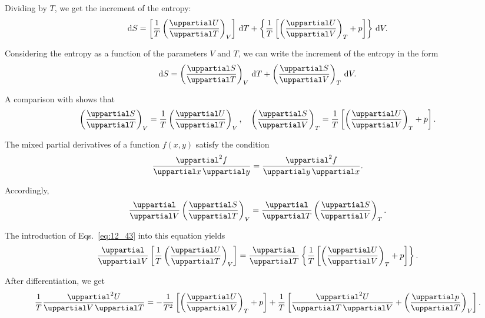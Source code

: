 Dividing  by $T$, we get the increment of the entropy:
\begin{equation}\label{eq:12_42}
	\deriv{S} = \bracket{\frac{1}{T} \parenthesis{\diffpartial{U}{T}}_V} \, \deriv{T} + \bracet{\frac{1}{T} \bracket{\parenthesis{\diffpartial{U}{V}}_T + p}}\,\deriv{V}.
\end{equation}

\noindent
Considering the entropy as a function of the parameters $V$ and $T$, we can write the increment of the entropy in the form
\begin{equation*}
	\deriv{S} = \parenthesis{\diffpartial{S}{T}}_V\,\deriv{T} + \parenthesis{\diffpartial{S}{V}}_T\,\deriv{V}.
\end{equation*}

\noindent
A comparison with  shows that
\begin{equation}\label{eq:12_43}
	\parenthesis{\diffpartial{S}{T}}_V = \frac{1}{T} \parenthesis{\diffpartial{U}{T}}_V,\quad \parenthesis{\diffpartial{S}{V}}_T = \frac{1}{T} \bracket{\parenthesis{\diffpartial{U}{V}}_T + p}.
\end{equation}

The mixed partial derivatives of a function $f(x, y)$ satisfy the condition
\begin{equation*}
	\frac{\uppartial^2f}{\uppartial x\,\uppartial y} = \frac{\uppartial^2f}{\uppartial y\,\uppartial x}.
\end{equation*}

\noindent
Accordingly,
\begin{equation*}
	\frac{\uppartial}{\uppartial V} \parenthesis{\diffpartial{S}{T}}_V = \frac{\uppartial}{\uppartial T} \parenthesis{\diffpartial{S}{V}}_T.
\end{equation*}

\noindent
The introduction of Eqs.~\eqref{eq:12_43} into this equation yields
\begin{equation*}
	\frac{\uppartial}{\uppartial V} \bracket{\frac{1}{T} \parenthesis{\diffpartial{U}{T}}_V} = \frac{\uppartial}{\uppartial T} \bracet{\frac{1}{T} \bracket{\parenthesis{\diffpartial{U}{V}}_T + p}}.
\end{equation*}

\noindent
After differentiation, we get
\begin{equation*}
	\frac{1}{T}\frac{\uppartial^2U}{\uppartial V\,\uppartial T} = -\frac{1}{T^2} \bracket{\parenthesis{\diffpartial{U}{V}}_T + p} + \frac{1}{T} \bracket{\frac{\uppartial^2U}{\uppartial T\,\uppartial V} + \parenthesis{\diffpartial{p}{T}}_V}.
\end{equation*}

